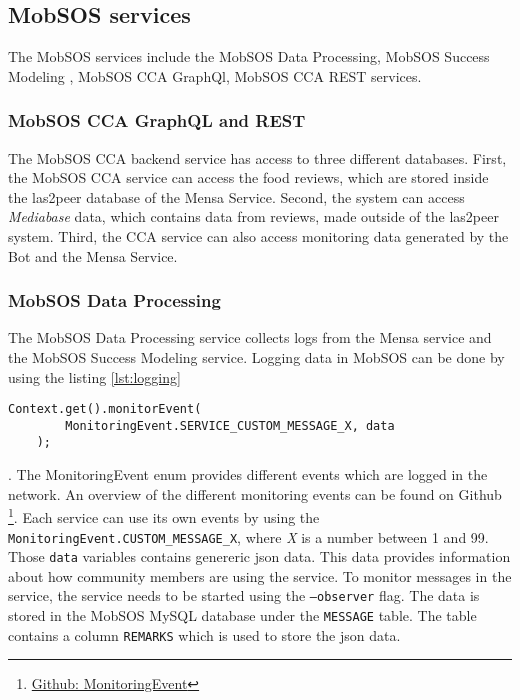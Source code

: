 \subsection{MobSOS services}
The MobSOS services include the MobSOS Data Processing, MobSOS Success Modeling , MobSOS CCA GraphQl, MobSOS CCA REST services.

\subsubsection{MobSOS CCA GraphQL and REST}
The MobSOS CCA backend service has access to three different databases. First, the MobSOS CCA service can access the food reviews, which are stored inside the las2peer database of the Mensa Service. Second, the system can access \emph{Mediabase} data, which contains data from reviews, made outside of the las2peer system. 
Third, the CCA service can also access monitoring data generated by the Bot and the Mensa Service. 


\subsubsection{MobSOS Data Processing}
The MobSOS Data Processing service collects logs from the Mensa service and the MobSOS Success Modeling service. 
Logging data in MobSOS can be done by using the listing \ref{lst:logging}
\begin{lstlisting}[caption=Example use of a MonitoringEvent,captionpos=b,label={lst:logging}]
    Context.get().monitorEvent(
        MonitoringEvent.SERVICE_CUSTOM_MESSAGE_X, data
    );
\end{lstlisting}.
The MonitoringEvent enum provides different events which are logged in the network. An overview of the different monitoring events can be found on Github \footnote{\href{https://github.com/rwth-acis/mobsos-data-processing/wiki/Built-In-Monitoring-Events}{Github: MonitoringEvent}}. 
Each service can use its own events by using the \texttt{MonitoringEvent.CUSTOM\_MESSAGE\_X}, where \emph{X} is a number between 1 and 99. 
Those \texttt{data} variables contains genereric json data. This data provides information about how community members are using the service.
To monitor messages in the service, the service needs to be started using the \texttt{--observer} flag.
The data is stored in the MobSOS MySQL database under the \texttt{MESSAGE} table. The table contains a column \texttt{REMARKS} which is used to store the json data.

